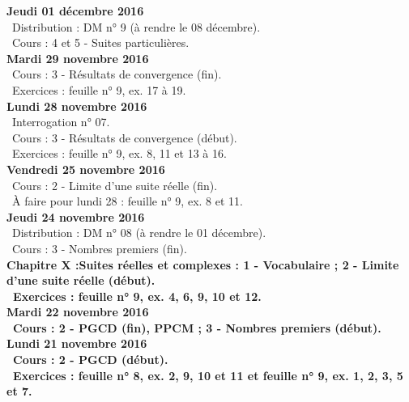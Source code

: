 \documentclass[12pt,a4paper]{article}
\begin{document}
\noindent\textbf{Jeudi 01 décembre 2016}\\
\bu\ Distribution : DM n° 9 (à rendre le 08 décembre).\\
\bu\ Cours : 4 et 5 - Suites particulières.\vspace{.4cm}\\

\noindent\textbf{Mardi 29 novembre 2016}\\
\bu\ Cours : 3 - Résultats de convergence (fin).\\
\bu\ Exercices : feuille n° 9, ex. 17 à 19.\vspace{.4cm}\\

\noindent\textbf{Lundi 28 novembre 2016} \\
\bu\ Interrogation n° 07.\\
\bu\ Cours : 3 - Résultats de convergence (début).\\
\bu\ Exercices : feuille n° 9, ex. 8, 11 et 13 à 16.\vspace{.4cm}\\

\noindent\textbf{Vendredi 25 novembre 2016}\\
\bu\ Cours : 2 - Limite d'une suite réelle (fin).\\
\bu\ À faire pour lundi 28 : feuille n° 9, ex. 8 et 11.\vspace{.4cm}\\

\noindent\textbf{Jeudi 24 novembre 2016}\\
\bu\ Distribution : DM n° 08 (à rendre le 01 décembre).\\
\bu\ Cours : 3 - Nombres premiers (fin).\\
\bf Chapitre X :\rm Suites réelles et complexes : 1 - Vocabulaire ; 2 - Limite 
d'une suite réelle (début).\\
\bu\ Exercices : feuille n° 9, ex. 4, 6, 9, 10 et 12.\vspace{.4cm}\\

\noindent\textbf{Mardi 22 novembre 2016}\\
\bu\ Cours : 2 - PGCD (fin), PPCM ; 3 - Nombres premiers (début).\vspace{.4cm}\\
   
\noindent\textbf{Lundi 21 novembre 2016}\\
\bu\ Cours : 2 - PGCD (début).\\
\bu\ Exercices : feuille n° 8, ex. 2, 9, 10 et 11 et feuille n° 9, ex. 1, 2, 3, 5 et 7.\vspace{.4cm}\\
\end{document}
